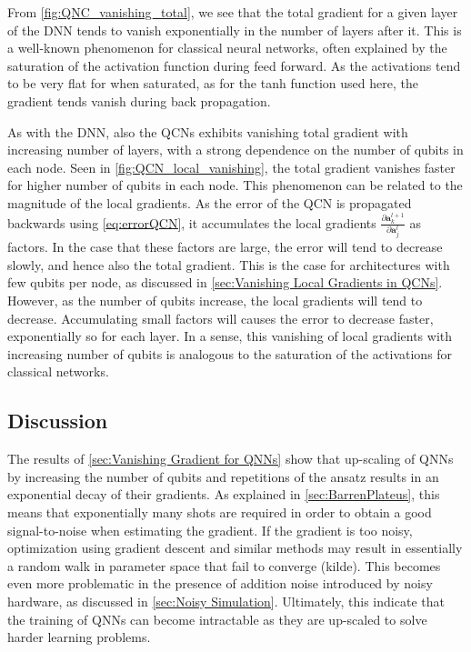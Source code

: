 From \autoref{fig:QNC_vanishing_total}, we see that the total gradient for a given layer of the DNN tends to vanish exponentially in the number of layers after it. This is a well-known phenomenon for classical neural networks, often explained by the saturation of the activation function during feed forward\cite{shalevshwartz2017failures}. As the activations tend to be very flat for when saturated, as for the tanh function used here, the gradient tends vanish during back propagation.

As with the DNN, also the QCNs exhibits vanishing total gradient with increasing number of layers, with a strong dependence on the number of qubits in each node. Seen in \autoref{fig:QCN_local_vanishing}, the total gradient vanishes faster for higher number of qubits in each node. This phenomenon can be related to the magnitude of the local gradients. As the error of the QCN is propagated backwards using \autoref{eq:errorQCN}, it accumulates the local gradients $\frac{\partial \boldsymbol{a}^{l+1}_k}{\partial \boldsymbol{a}^{l}_j}$ as factors. In the case that these factors are large, the error will tend to decrease slowly, and hence also the total gradient. This is the case for architectures with few qubits per node, as discussed in \autoref{sec:Vanishing Local Gradients in QCNs}. However, as the number of qubits increase, the local gradients will tend to decrease. Accumulating small factors will causes the error to decrease faster, exponentially so for each layer. In a sense, this vanishing of local gradients with increasing number of qubits is analogous to the saturation of the activations for classical networks.

\subsection{Discussion}\label{sec:Vanishing Gradient Phenomenon Discussion}
The results of \autoref{sec:Vanishing Gradient for QNNs} show that up-scaling of QNNs by increasing the number of qubits and repetitions of the ansatz results in an exponential decay of their gradients. As explained in \autoref{sec:BarrenPlateus}, this means that exponentially many shots are required in order to obtain a good signal-to-noise when estimating the gradient. If the gradient is too noisy, optimization using gradient descent and similar methods may result in essentially a random walk in parameter space that fail to converge (kilde). This becomes even more problematic in the presence of addition noise introduced by noisy hardware, as discussed in \autoref{sec:Noisy Simulation}. Ultimately, this indicate that the training of QNNs can become intractable as they are up-scaled to solve harder learning problems.    

